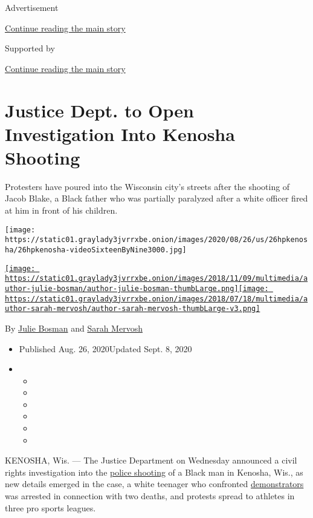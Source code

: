 Advertisement

\protect\hyperlink{after-top}{Continue reading the main story}

Supported by

\protect\hyperlink{after-sponsor}{Continue reading the main story}

\hypertarget{justice-dept-to-open-investigation-into-kenosha-shooting}{%
\section{Justice Dept. to Open Investigation Into Kenosha
Shooting}\label{justice-dept-to-open-investigation-into-kenosha-shooting}}

Protesters have poured into the Wisconsin city's streets after the
shooting of Jacob Blake, a Black father who was partially paralyzed
after a white officer fired at him in front of his children.

\texttt{[image: https://static01.graylady3jvrrxbe.onion/images/2020/08/26/us/26hpkenosha/26hpkenosha-videoSixteenByNine3000.jpg]}

\href{https://www.nytimes3xbfgragh.onion/by/julie-bosman}{\texttt{[image: https://static01.graylady3jvrrxbe.onion/images/2018/11/09/multimedia/author-julie-bosman/author-julie-bosman-thumbLarge.png]}}\href{https://www.nytimes3xbfgragh.onion/by/sarah-mervosh}{\texttt{[image: https://static01.graylady3jvrrxbe.onion/images/2018/07/18/multimedia/author-sarah-mervosh/author-sarah-mervosh-thumbLarge-v3.png]}}

By \href{https://www.nytimes3xbfgragh.onion/by/julie-bosman}{Julie
Bosman} and
\href{https://www.nytimes3xbfgragh.onion/by/sarah-mervosh}{Sarah
Mervosh}

\begin{itemize}
\item
  Published Aug. 26, 2020Updated Sept. 8, 2020
\item
  \begin{itemize}
  \item
  \item
  \item
  \item
  \item
  \item
  \end{itemize}
\end{itemize}

KENOSHA, Wis. --- The Justice Department on Wednesday announced a civil
rights investigation into the
\href{https://www.nytimes3xbfgragh.onion/2020/09/08/us/salt-lake-city-autism-shooting.html}{police
shooting} of a Black man in Kenosha, Wis., as new details emerged in the
case, a white teenager who confronted
\href{https://www.nytimes3xbfgragh.onion/2020/09/02/upshot/trump-democratic-cities.html}{demonstrators}
was arrested in connection with two deaths, and protests spread to
athletes in three pro sports leagues.


